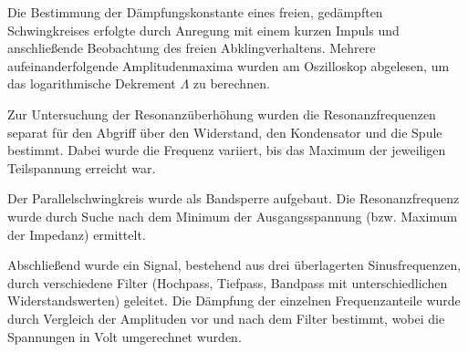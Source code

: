 Die Bestimmung der Dämpfungskonstante eines freien, gedämpften Schwingkreises erfolgte durch Anregung mit einem kurzen Impuls und anschließende Beobachtung des freien Abklingverhaltens. Mehrere aufeinanderfolgende Amplitudenmaxima wurden am Oszilloskop abgelesen, um das logarithmische Dekrement $\Lambda$ zu berechnen.

Zur Untersuchung der Resonanzüberhöhung wurden die Resonanzfrequenzen separat für den Abgriff über den Widerstand, den Kondensator und die Spule bestimmt. Dabei wurde die Frequenz variiert, bis das Maximum der jeweiligen Teilspannung erreicht war.

Der Parallelschwingkreis wurde als Bandsperre aufgebaut. Die Resonanzfrequenz wurde durch Suche nach dem Minimum der Ausgangsspannung (bzw. Maximum der Impedanz) ermittelt.

Abschließend wurde ein Signal, bestehend aus drei überlagerten Sinusfrequenzen, durch verschiedene Filter (Hochpass, Tiefpass, Bandpass mit unterschiedlichen Widerstandswerten) geleitet. Die Dämpfung der einzelnen Frequenzanteile wurde durch Vergleich der Amplituden vor und nach dem Filter bestimmt, wobei die Spannungen in Volt umgerechnet wurden.
